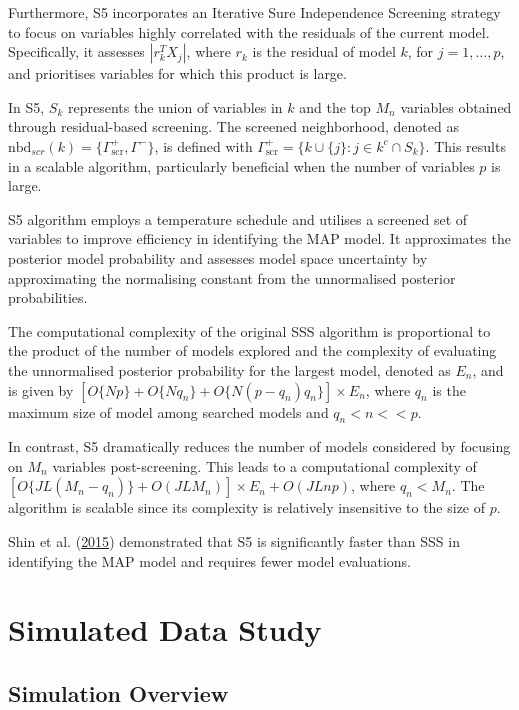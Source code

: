 \documentclass[
  11pt,
]{article}
\begin{document}
Furthermore, S5 incorporates an Iterative Sure Independence Screening
strategy to focus on variables highly correlated with the residuals of
the current model. Specifically, it assesses \(|r_k^T X_j|\), where
\(r_k\) is the residual of model \(k\), for \(j = 1, \ldots, p\), and
prioritises variables for which this product is large.

In S5, \(S_k\) represents the union of variables in \(k\) and the top
\(M_n\) variables obtained through residual-based screening. The
screened neighborhood, denoted as
\(\text{nbd}_{scr}(k) = \{\Gamma^{+}_{\text{scr}}, \Gamma^{-}\}\), is
defined with
\(\Gamma^{+}_{\text{scr}} = \{k \cup \{j\} : j \in k^c \cap S_k\}\).
This results in a scalable algorithm, particularly beneficial when the
number of variables \(p\) is large.

S5 algorithm employs a temperature schedule and utilises a screened set
of variables to improve efficiency in identifying the MAP model. It
approximates the posterior model probability and assesses model space
uncertainty by approximating the normalising constant from the
unnormalised posterior probabilities.

The computational complexity of the original SSS algorithm is
proportional to the product of the number of models explored and the
complexity of evaluating the unnormalised posterior probability for the
largest model, denoted as \(E_n\), and is given by
\([ O\{Np\} + O\{Nq_n\} + O\{N(p-q_n)q_n\} ] \times E_n\), where \(q_n\)
is the maximum size of model among searched models and \(q_n < n <<p\).

In contrast, S5 dramatically reduces the number of models considered by
focusing on \(M_n\) variables post-screening. This leads to a
computational complexity of
\([O\{JL(M_n - q_n)\} + O(JLM_n)] \times E_n + O(JLnp)\), where
\(q_n < M_n\). The algorithm is scalable since its complexity is
relatively insensitive to the size of \(p\).

Shin et al. (\protect\hyperlink{ref-Shin2015}{2015}) demonstrated that
S5 is significantly faster than SSS in identifying the MAP model and
requires fewer model evaluations.

\newpage

\section{Simulated Data Study}

\subsection{Simulation Overview}
\end{document}
